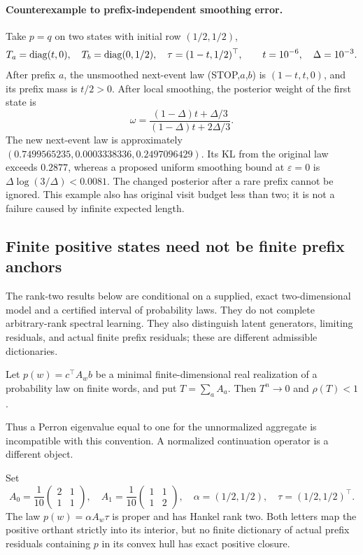 \paragraph{Counterexample to prefix-independent smoothing error.}
Take $p=q$ on two states with initial row $(1/2,1/2)$,
\[
 T_a=\operatorname{diag}(t,0),\quad T_b=\operatorname{diag}(0,1/2),\quad
 \tau=(1-t,1/2)^\top,
 \qquad t=10^{-6},\quad\Delta=10^{-3}.
\]
After prefix $a$, the unsmoothed next-event law (STOP,$a$,$b$) is
$(1-t,t,0)$, and its prefix mass is $t/2>0$. After local smoothing,
the posterior weight of the first state is
\[
 \omega=\frac{(1-\Delta)t+\Delta/3}
                   {(1-\Delta)t+2\Delta/3}.
\]
The new next-event law is approximately
$(0.7499565235,0.0003338336,0.2497096429)$.
Its KL from the original law exceeds $0.2877$, whereas a proposed uniform smoothing bound at $\varepsilon=0$ is
$\Delta\log(3/\Delta)<0.0081$. The changed posterior after a rare
prefix cannot be ignored. This example also has original visit budget
less than two; it is not a failure caused by infinite expected length.


\subsection{Finite positive states need not be finite prefix anchors}
\label{II:U:sec:rank-two-obstruction}
The rank-two results below are conditional on a supplied, exact
two-dimensional model and a certified interval of probability laws.
They do not complete arbitrary-rank spectral learning. They also
distinguish latent generators, limiting residuals, and actual finite
prefix residuals; these are different admissible dictionaries.

\begin{lemma}
\label{II:U:lem:proper-aggregate-stable}
Let $p(w)=c^\top A_wb$ be a minimal finite-dimensional real realization
of a probability law on finite words, and put $T=\sum_a A_a$.
Then $T^n\to0$ and $\rho(T)<1$.
\end{lemma}

Thus a Perron eigenvalue equal to one for the unnormalized aggregate
is incompatible with this convention. A normalized continuation
operator is a different object.

\begin{proposition}
\label{II:U:prop:golden-prefix-obstruction}
Set
\[
 A_0=\frac1{10}\begin{pmatrix}2&1\\1&1\end{pmatrix},\quad
 A_1=\frac1{10}\begin{pmatrix}1&1\\1&2\end{pmatrix},\quad
 \alpha=(1/2,1/2),\quad \tau=(1/2,1/2)^\top.
\]
The law $p(w)=\alpha A_w\tau$ is proper and has Hankel rank two.
Both letters map the positive orthant strictly into its interior,
but no finite dictionary of actual prefix residuals containing $p$
in its convex hull has exact positive closure.
\end{proposition}



